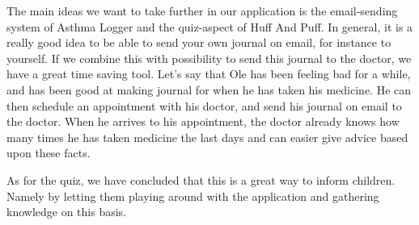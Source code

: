 The main ideas we want to take further in our application is the email-sending system of Asthma Logger and the quiz-aspect of Huff And Puff. In general, it is a really good idea to be able to send your own journal on email, for instance to yourself. If we combine this with possibility to send this journal to the doctor, we have a great time saving tool. Let's say that Ole has been feeling bad for a while, and has been good at making journal for when he has taken his medicine. He can then schedule an appointment with his doctor, and send his journal on email to the doctor. When he arrives to his appointment, the doctor already knows how many times he has taken medicine the last days and can easier give advice based upon these facts. 
 

As for the quiz, we have concluded that this is a great way to inform children. Namely by letting them playing around with the application and gathering knowledge on this basis. 




